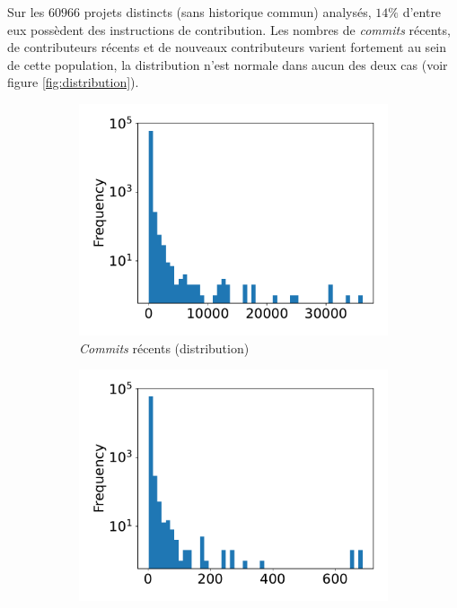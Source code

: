 \documentclass[dvipsnames,runningheads]{llncs}
\newcommand{\en}[1]{\foreignlanguage{english}{\emph{#1}}}
\begin{document}
    Sur les $60 966$ projets distincts (sans historique commun) analysés, $14\%$ d'entre eux possèdent des
    instructions de contribution. Les nombres de \en{commits} récents, de contributeurs récents et de nouveaux
    contributeurs varient fortement au sein de cette population, la distribution n'est normale dans aucun des
    deux cas (voir figure \ref{fig:distribution}).

    \begin{figure}[ht]
        \begin{subfigure}[t]{0.333\textwidth}
            \includegraphics[width=\textwidth]{../experiment/data_analysis/recentCommitCount_distribution}
            \caption{\en{Commits} récents (distribution)}
        \end{subfigure}
        \begin{subfigure}[t]{0.333\textwidth}
            \includegraphics[width=\textwidth]{../experiment/data_analysis/recentContributorCount_distribution}

\end{subfigure}
\end{figure}
\end{document}
